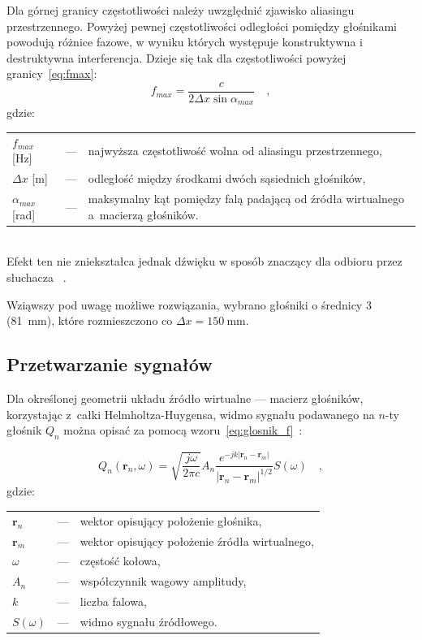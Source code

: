 \documentclass[10pt, a4paper]{article}
\let\Oldsubsection\subsection
\renewcommand{\subsection}{\FloatBarrier\Oldsubsection}
\begin{document}
Dla górnej granicy częstotliwości należy uwzględnić zjawisko aliasingu
przestrzennego. Powyżej pewnej częstotliwości odległości pomiędzy głośnikami
powodują różnice fazowe, w wyniku których występuje konstruktywna i
destruktywna interferencja. Dzieje się tak dla częstotliwości powyżej
granicy~\eqref{eq:fmax}:
\begin{equation}
  f_{max}=\frac{c}{2\Delta x \sin{\alpha_{max}}} \quad, \label{eq:fmax}
\end{equation}
gdzie:\\
\indent \begin{tabular}{l c p{}}
  $f_{max}$ [\si{\hertz}] & --- & najwyższa częstotliwość wolna od aliasingu przestrzennego, \\
  $\Delta x$ [\si{\metre}] & --- & odległość między środkami dwóch sąsiednich głośników, \\
  $\alpha_{max}$ [\si{\radian}] & --- & maksymalny kąt pomiędzy falą padającą od źródła wirtualnego a~macierzą głośników.\\
\end{tabular}\\

\noindent Efekt ten nie zniekształca jednak dźwięku w sposób znaczący dla odbioru przez słuchacza
~\cite{hq_rendering}.

Wziąwszy pod uwagę możliwe rozwiązania, wybrano głośniki o średnicy \SI{3}{\inch}
(\SI{81}{\milli\meter}), które rozmieszczono co
$\Delta x=\SI{150}{\milli\meter}$.

\subsection{Przetwarzanie sygnałów}\label{s:algorithm}

Dla określonej geometrii układu źródło wirtualne --- macierz głośników,
korzystając z~całki Helmholtza-Huygensa, widmo sygnału podawanego na $n$-ty
głośnik $Q_n$ można opisać za pomocą wzoru~\eqref{eq:glosnik_f}~\cite{delay}:

\begin{equation}
  Q_n(\bm{r}_n,\omega) = \sqrt{\frac{j\omega}{2\pi c}} A_n \frac {e^{-jk|\bm{r}_n-\bm{r}_m|}}{|\bm{r}_n-\bm{r}_m|^{1/2}} S(\omega) \quad,
  \label{eq:glosnik_f}
\end{equation}
gdzie:\\
\indent \begin{tabular}{l c p{}}
  $\bm{r}_n$ & --- & wektor opisujący położenie głośnika, \\
  $\bm{r}_m$ & --- & wektor opisujący położenie źródła wirtualnego,\\
  $\omega$ & --- & częstość kołowa, \\
  $A_n$ & --- & współczynnik wagowy amplitudy,\\
  $k$ & --- & liczba falowa,\\
  $S(\omega)$ & --- & widmo sygnału źródłowego.
\end{tabular}\\
\end{document}
